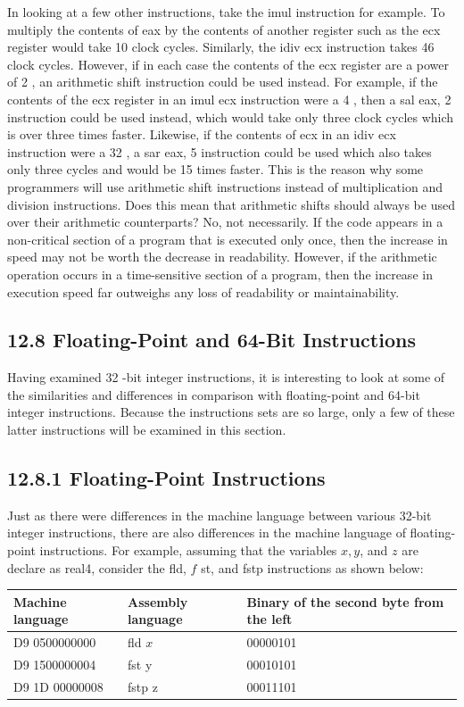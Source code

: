 \documentclass[10pt]{book}
\begin{document}
\begin{center}
\begin{center}
\begin{center}
\begin{center}
\begin{center}
In looking at a few other instructions, take the imul instruction for example. To multiply the contents of eax by the contents of another register such as the ecx register would take 10 clock cycles. Similarly, the idiv ecx instruction takes 46 clock cycles. However, if in each case the contents of the ecx register are a power of 2 , an arithmetic shift instruction could be used instead. For example, if the contents of the ecx register in an imul ecx instruction were a 4 , then a sal eax, 2 instruction could be used instead, which would take only three clock cycles which is over three times faster. Likewise, if the contents of ecx in an idiv ecx instruction were a 32 , a sar eax, 5 instruction could be used which also takes only three cycles and would be 15 times faster. This is the reason why some programmers will use arithmetic shift instructions instead of multiplication and division instructions. Does this mean that arithmetic shifts should always be used over their arithmetic counterparts? No, not necessarily. If the code appears in a non-critical section of a program that is executed only once, then the increase in speed may not be worth the decrease in readability. However, if the arithmetic operation occurs in a time-sensitive section of a program, then the increase in execution speed far outweighs any loss of readability or maintainability.

\subsection*{12.8 Floating-Point and 64-Bit Instructions}
Having examined 32 -bit integer instructions, it is interesting to look at some of the similarities and differences in comparison with floating-point and 64-bit integer instructions. Because the instructions sets are so large, only a few of these latter instructions will be examined in this section.

\subsection*{12.8.1 Floating-Point Instructions}
Just as there were differences in the machine language between various 32-bit integer instructions, there are also differences in the machine language of floating-point instructions. For example, assuming that the variables $x, y$, and $z$ are declare as real4, consider the fld, $f$ st, and fstp instructions as shown below:


\begin{center}
\begin{tabular}{|l|l|l|}
\hline
Machine language & Assembly language & Binary of the second byte from the left \\
\hline
D9 0500000000 & fld $x$ & 00000101 \\
\hline
D9 1500000004 & fst y & 00010101 \\
\hline
D9 1D 00000008 & fstp z & 00011101 \\
\hline
\end{tabular}
\end{center}


\end{center}
\end{center}
\end{center}
\end{center}
\end{center}
\end{document}
